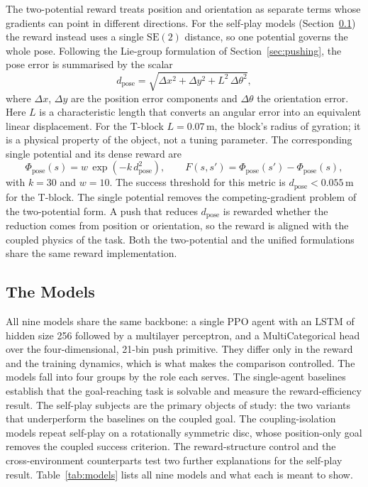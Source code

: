 The two-potential reward treats position and orientation as separate terms whose
gradients can point in different directions. For the self-play models
(Section~\ref{sec:models}) the reward instead uses a single $\mathrm{SE}(2)$
distance, so one potential governs the whole pose. Following the Lie-group
formulation of Section~\ref{sec:pushing}, the pose error is summarised by the
scalar
\begin{equation}
    d_{\text{pose}} = \sqrt{\Delta x^2 + \Delta y^2 + L^2\, \Delta\theta^2},
    \label{eq:dpose_methods}
\end{equation}
where $\Delta x$, $\Delta y$ are the position error components and $\Delta\theta$
the orientation error. Here $L$ is a characteristic length that converts an
angular error into an equivalent linear displacement. For the T-block $L =
0.07\,\text{m}$, the block's radius of gyration; it is a physical property of the
object, not a tuning parameter. The corresponding single potential and its dense
reward are
\begin{equation}
    \Phi_{\text{pose}}(s) = w\, \exp\!\left(-k\, d_{\text{pose}}^2\right),
    \qquad F(s,s') = \Phi_{\text{pose}}(s') - \Phi_{\text{pose}}(s),
    \label{eq:phi_dpose}
\end{equation}
with $k = 30$ and $w = 10$. The success threshold for this metric is
$d_{\text{pose}} < 0.055\,\text{m}$ for the T-block. The single potential removes
the competing-gradient problem of the two-potential form. A push that reduces
$d_{\text{pose}}$ is rewarded whether the reduction comes from position or
orientation, so the reward is aligned with the coupled physics of the task. Both
the two-potential and the unified formulations share the same reward
implementation.

\subsection{The Models}
\label{sec:models}

All nine models share the same backbone: a single PPO agent with an LSTM of hidden
size 256 followed by a multilayer perceptron, and a MultiCategorical head over the
four-dimensional, 21-bin push primitive. They differ only in the reward and the
training dynamics, which is what makes the comparison controlled. The models fall
into four groups by the role each serves. The single-agent baselines establish that
the goal-reaching task is solvable and measure the reward-efficiency result. The
self-play subjects are the primary objects of study: the two variants that
underperform the baselines on the coupled goal. The coupling-isolation models repeat
self-play on a rotationally symmetric disc, whose position-only goal removes the
coupled success criterion. The reward-structure control and the cross-environment
counterparts test two further explanations for the self-play result.
Table~\ref{tab:models} lists all nine models and what each is meant to show.

